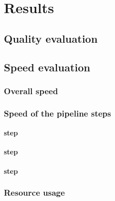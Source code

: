 \chapter{Results}
\label{chap:results}

\section{Quality evaluation}

\section{Speed evaluation}
\subsection{Overall speed}
\subsection{Speed of the pipeline steps}
\subsubsection{\locate* step}
\subsubsection{\match* step}
\subsubsection{\link* step}
\subsection{Resource usage}
